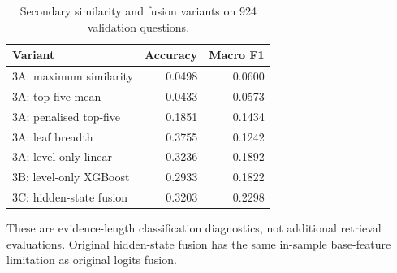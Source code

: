 \begin{table}[htbp]
\centering\small
\caption{Secondary similarity and fusion variants on 924 validation questions.}
\label{tab:secondaryvariants}
\begin{tabular}{@{}lrr@{}}
\toprule
Variant & Accuracy & Macro F1\\
\midrule
3A: maximum similarity & 0.0498 & 0.0600\\
3A: top-five mean & 0.0433 & 0.0573\\
3A: penalised top-five & 0.1851 & 0.1434\\
3A: leaf breadth & 0.3755 & 0.1242\\
3A: level-only linear & 0.3236 & 0.1892\\
3B: level-only XGBoost & 0.2933 & 0.1822\\
3C: hidden-state fusion & 0.3203 & 0.2298\\
\bottomrule
\end{tabular}
\par\smallskip\begin{minipage}{\textwidth}\footnotesize These are evidence-length classification diagnostics, not additional retrieval evaluations. Original hidden-state fusion has the same in-sample base-feature limitation as original logits fusion.\end{minipage}
\end{table}
